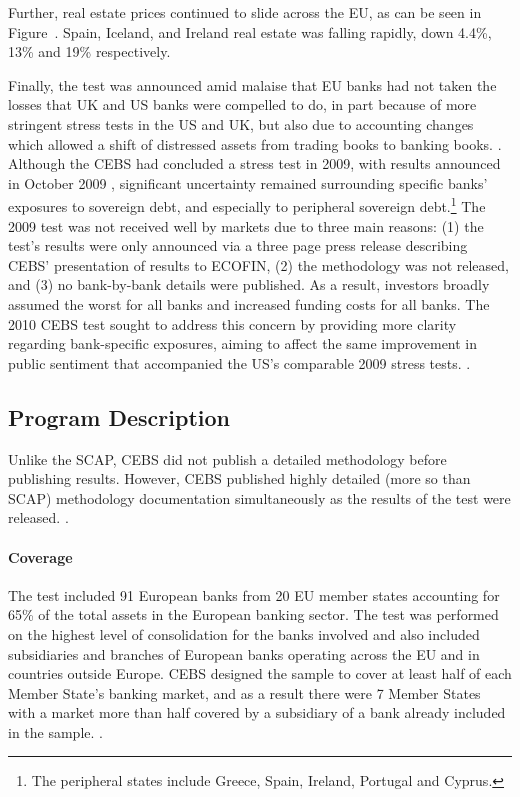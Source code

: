 \documentclass[12pt]{article}
\begin{document}
Further, real estate prices continued to slide across the EU, as can be seen in Figure~\label{figure2}. Spain, Iceland, and Ireland real estate was falling rapidly, down 4.4\%, 13\% and 19\% respectively.

Finally, the test was announced amid malaise that EU banks had not taken the losses that UK and US banks were compelled to do, in part because of more stringent stress tests in the US and UK, but also due to accounting changes which allowed a shift of distressed assets from trading books to banking books. \citep{Sunderji}. Although the CEBS had concluded a stress test in 2009, with results announced in October 2009 \citep{CEBSOctober2009}, significant uncertainty remained surrounding specific banks' exposures to sovereign debt, and especially to peripheral sovereign debt.\footnote{The peripheral states include Greece, Spain, Ireland, Portugal and Cyprus.} The 2009 test was not received well by markets due to three main reasons: (1) the test's results were only announced via a three page press release describing CEBS' presentation of results to ECOFIN, (2) the methodology was not released, and (3) no bank-by-bank details were published. As a result, investors broadly assumed the worst for all banks and increased funding costs for all banks. The 2010 CEBS test sought to address this concern by providing more clarity regarding bank-specific exposures, aiming to affect the same improvement in public sentiment that accompanied the US's comparable 2009 stress tests. \citep{Goldman}.

\subsection{Program Description}

Unlike the SCAP, CEBS did not publish a detailed methodology before publishing results. However, CEBS published highly detailed (more so than SCAP) methodology documentation simultaneously as the results of the test were released. \citep{Methodology}.

\paragraph{Coverage} The test included 91 European banks from 20 EU member states accounting for 65\% of the total assets in the European banking sector. The test was performed on the highest level of consolidation for the banks involved and also included subsidiaries and branches of European banks operating across the EU and in countries outside Europe. CEBS designed the sample to cover at least half of each Member State's banking market, and as a result there were 7 Member States with a market more than half covered by a subsidiary of a bank already included in the sample. \citep{Methodology}.
\end{document}
